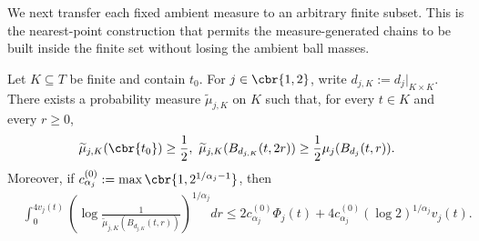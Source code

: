 \documentclass[11pt]{article}
\begin{document}
We next transfer each fixed ambient measure to an arbitrary finite
subset. This is the nearest-point construction that permits the
measure-generated chains to be built inside the finite set without
losing the ambient ball masses.

\begin{lemma}
\label{lem:mixed_tail_ambient_restriction}
Let $K\subseteq T$ be finite and contain $t_0$. For
$j\in\cbr{1,2}$, write $d_{j,K}:=d_j|_{K\times K}$.
There exists a probability measure $\widetilde\mu_{j,K}$ on $K$ such
that, for every $t\in K$ and every $r\ge0$,
\begin{align*}
\widetilde\mu_{j,K}(\cbr{t_0})
\ge\frac12,\ 
\widetilde\mu_{j,K}(B_{d_{j,K}}(t,2r))
\ge
\frac12\mu_j(B_{d_j}(t,r)).
\end{align*}
Moreover, if $c_{\alpha_j}^{(0)}
:=
\max\cbr{1,2^{1/\alpha_j-1}}$, then
\begin{align*}
&\int_0^{4v_j(t)}
\left(
\log\frac{1}{
\widetilde\mu_{j,K}(B_{d_{j,K}}(t,r))
}
\right)^{1/\alpha_j}dr\le
2c_{\alpha_j}^{(0)}
\Phi_j(t)
+
4c_{\alpha_j}^{(0)}
(\log2)^{1/\alpha_j}v_j(t).
\end{align*}
\end{lemma}
\end{document}

